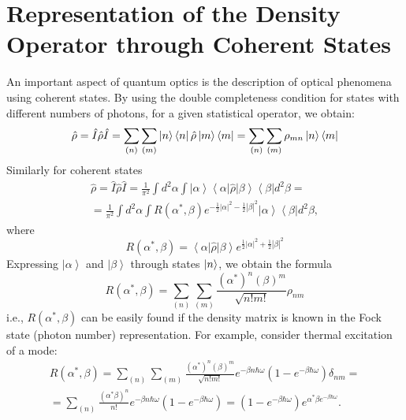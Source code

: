 \section{Representation of the Density Operator through Coherent States}
An important aspect of quantum optics is the description of optical phenomena using coherent states. By using the double completeness condition for states with different numbers of photons, for a given statistical operator, we obtain:
\[
\hat{\rho} = \hat{I}\hat{\rho}\hat{I} = 
\sum_{(n)}\sum_{(m)}
\ket{n}\bra{n}\hat{\rho}\ket{m}\bra{m} = 
\sum_{(n)}\sum_{(m)} \rho_{mn}\ket{n}\bra{m}
\]
Similarly for coherent states
\begin{eqnarray}
\hat{\rho} = \hat{I}\hat{\rho}\hat{I} = 
\frac{1}{\pi^2}\int d^2\alpha\int
\left|\alpha\right>\left<\alpha\right|\hat{\rho}\left|\beta\right>\left<\beta\right|
d^2 \beta = 
\nonumber \\
= \frac{1}{\pi^2} \int d^2\alpha \int
R\left(\alpha^{*}, \beta\right) e^{-\frac{1}{2}\left|\alpha\right|^2 -\frac{1}{2}\left|\beta\right|^2}
\left|\alpha\right>\left<\beta\right|d^2 \beta ,
\end{eqnarray}
where
\[
R\left(\alpha^{*}, \beta\right) =
\left<\alpha\right|\hat{\rho}\left|\beta\right>
e^{\frac{1}{2}\left|\alpha\right|^2 +\frac{1}{2}\left|\beta\right|^2}
\]
Expressing $\left|\alpha\right>$ and $\left|\beta\right>$ through states $\ket{n}$, we obtain the formula
\begin{equation}
R\left(\alpha^{*}, \beta\right) = \sum_{(n)}\sum_{(m)}
\frac{\left(\alpha^{*}\right)^n \left(\beta\right)^m}{\sqrt{n!m!}}\rho_{nm}
\end{equation}
i.e., $R\left(\alpha^{*}, \beta\right)$ can be easily found if the density matrix
is known in the Fock state (photon number) representation. For example, consider thermal excitation of a mode:
\begin{eqnarray}
R\left(\alpha^{*}, \beta\right) = \sum_{(n)}\sum_{(m)}
\frac{\left(\alpha^{*}\right)^n \left(\beta\right)^m}{\sqrt{n!m!}}
e^{-\beta n \hbar \omega}\left(1  -  e^{-\beta \hbar \omega}\right)
\delta_{nm} = 
\nonumber \\
= \sum_{(n)}\frac{\left(\alpha^{*} \beta\right)^n }{n!}
e^{-\beta n \hbar \omega}\left(1  -  e^{-\beta \hbar \omega}\right) =
\left(1  -  e^{-\beta \hbar \omega}\right) e^{\alpha^{*}\beta
  e^{-\beta \hbar \omega}}.
\end{eqnarray}

